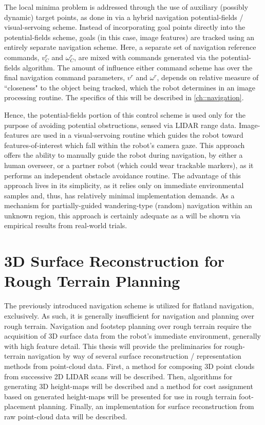 		The local minima problem is addressed through the use of auxiliary (possibly dynamic) target points, as done in \cite{ArambulaCosio2004} via a hybrid navigation potential-fields / visual-servoing scheme. Instead of incorporating goal points directly into the potential-fields scheme, goals (in this case, image features) are tracked using an entirely separate navigation scheme. Here, a separate set of navigation reference commands, $v^{r}_{C}$ and $\omega^{r}_{C}$, are mixed with commands generated via the potential-fields algorithm. The amount of influence either command scheme has over the final navigation command parameters, $v^{r}$ and $\omega^{r}$, depends on relative measure of ``closeness" to the object being tracked, which the robot determines in an image processing routine. The specifics of this will be described in \ref{ch::navigation}. 

		Hence, the potential-fields portion of this control scheme is used only for the purpose of avoiding potential obstructions, sensed via LIDAR range data. Image-features are used in a visual-servoing routine which guides the robot toward features-of-interest which fall within the robot’s camera gaze. This approach offers the ability to manually guide the robot during navigation, by either a human overseer, or a partner robot (which could wear trackable markers), as it performs an independent obstacle avoidance routine. The advantage of this approach lives in its simplicity, as it relies only on immediate environmental samples and, thus, has relatively minimal implementation demands.  As a mechanism for partially-guided wandering-type (random) navigation within an unknown region, this approach is certainly adequate as a will be shown via empirical results from real-world trials.




	\section{3D Surface Reconstruction for Rough Terrain Planning}

		The previously introduced navigation scheme is utilized for flatland navigation, exclusively. As such, it is generally insufficient for navigation and planning over rough terrain. Navigation and footstep planning over rough terrain require the acquisition of 3D surface data from the robot’s immediate environment, generally with high feature detail. This thesis will provide the preliminaries for rough-terrain navigation by way of several surface reconstruction / representation methods from point-cloud data. First, a method for composing 3D point clouds from successive 2D LIDAR scans will be described. Then, algorithms for generating 3D height-maps will be described and a method for cost assignment based on generated height-maps will be presented for use in rough terrain foot-placement planning. Finally, an implementation for surface reconstruction from raw point-cloud data will be described.

